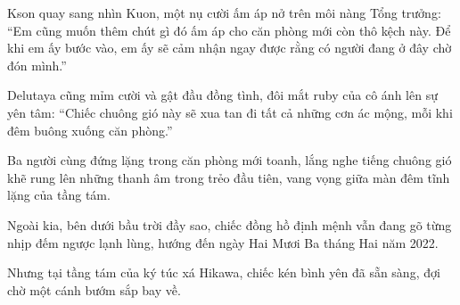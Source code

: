 ﻿\documentclass[../main.tex]{subfiles}
\begin{document}
Kson quay sang nhìn Kuon, một nụ cười ấm áp nở trên môi nàng Tổng trưởng: ``Em cũng muốn thêm chút gì đó ấm áp cho căn phòng mới còn thô kệch này. Để khi em ấy bước vào, em ấy sẽ cảm nhận ngay được rằng có người đang ở đây chờ đón mình.''

Delutaya cũng mỉm cười và gật đầu đồng tình, đôi mắt ruby của cô ánh lên sự yên tâm: ``Chiếc chuông gió này sẽ xua tan đi tất cả những cơn ác mộng, mỗi khi đêm buông xuống căn phòng.''

Ba người cùng đứng lặng trong căn phòng mới toanh, lắng nghe tiếng chuông gió khẽ rung lên những thanh âm trong trẻo đầu tiên, vang vọng giữa màn đêm tĩnh lặng của tầng tám.

Ngoài kia, bên dưới bầu trời đầy sao, chiếc đồng hồ định mệnh vẫn đang gõ từng nhịp đếm ngược lạnh lùng, hướng đến ngày Hai Mươi Ba tháng Hai năm 2022.

Nhưng tại tầng tám của ký túc xá Hikawa, chiếc kén bình yên đã sẵn sàng, đợi chờ một cánh bướm sắp bay về.
\end{document}
